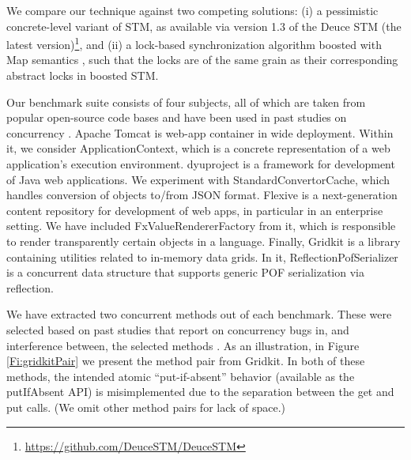 We compare our technique against two competing solutions: (i) a pessimistic concrete-level variant of STM, as available via version 1.3 of the Deuce STM (the latest version)\footnote{
		\url{https://github.com/DeuceSTM/DeuceSTM}
	}, and (ii)  a lock-based synchronization algorithm boosted with {\sf Map} semantics \cite{ppopp/HerlihyK08}, such that the locks are of the same grain as their corresponding abstract locks in boosted STM.

%
Our benchmark suite consists of four subjects, all of which are taken from popular open-source code bases and have been used in past studies on concurrency \cite{oopsla/ShachamBASVY11,issta/ShachamYGABSV14}.
	Apache Tomcat is web-app container in wide deployment. Within it, we consider {\sf ApplicationContext}, which is a concrete representation of a web application's execution environment.
	dyuproject is a framework for development of Java web applications. We experiment with {\sf StandardConvertorCache}, which handles conversion of objects to/from JSON format.
	Flexive is a next-generation content repository for development of web apps, in particular in an enterprise setting. We have included {\sf FxValueRendererFactory} from it, which is responsible to render transparently certain objects in a language.
	Finally, Gridkit is a library containing utilities related to in-memory data grids. In it, {\sf ReflectionPofSerializer} is a concurrent data structure that supports generic POF serialization via reflection.

We have extracted two concurrent methods out of each benchmark. These were selected based on past studies that report on concurrency bugs in, and interference between, the selected methods \cite{oopsla/ShachamBASVY11}. 
%
As an illustration, in Figure \ref{Fi:gridkitPair} we present the method pair from Gridkit. In both of these methods, the intended atomic ``put-if-absent'' behavior (available as the {\sf putIfAbsent} API) is misimplemented due to the separation between the {\sf get} and {\sf put} calls. (We omit other method pairs for lack of space.)

